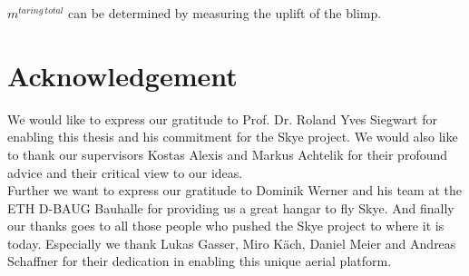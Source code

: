 $m^{taring~total}$ can be determined by measuring the uplift of the blimp.

\section{Acknowledgement}
We would like to express our gratitude to Prof. Dr. Roland Yves Siegwart for enabling this thesis and his commitment for the Skye project.
We would also like to thank our supervisors Kostas Alexis and Markus Achtelik for their profound advice and their critical view to our ideas. \\
Further we want to express our gratitude to Dominik Werner and his team at the ETH D-BAUG Bauhalle for providing us a great hangar to fly Skye.
And finally our thanks goes to all those people who pushed the Skye project to where it is today.
Especially we thank Lukas Gasser, Miro K\"ach, Daniel Meier and Andreas Schaffner for their dedication in enabling this unique aerial platform. 


